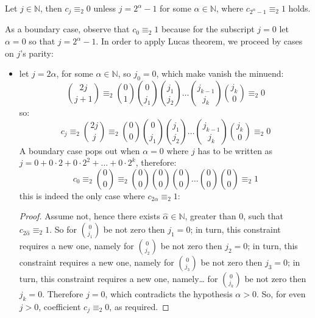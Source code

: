 \begin{theorem}
    Let $j\in\mathbb{N}$, then $c_{j} \equiv_{2} 0$ unless $j=2^{\alpha}-1$ for some $\alpha\in\mathbb{N}$, 
    where $c_{2^{\alpha}-1} \equiv_{2} 1$ holds.
\end{theorem}
As a boundary case, observe that $c_{0} \equiv_{2} 1$ because for the subscript $j=0$
let $\alpha=0$ so that $j = 2^{\alpha}-1$. In order to apply Lucas theorem, we proceed by cases on $j$'s parity:
\begin{itemize}
    \item let $j=2\alpha$, for some $\alpha\in\mathbb{N}$, so $j_{0}=0$,
        which make vanish the minuend:
        \begin{displaymath}
            {{2j}\choose{j+1}}
            \equiv_{2} {{0}\choose{1}}{{0}\choose{j_{1}}}{{j_{1}}\choose{j_{2}}}
                \ldots{{j_{k-1}}\choose{j_{k}}}{{j_{k}}\choose{0}}\equiv_{2}0
        \end{displaymath}
        so:
        \begin{displaymath}
            c_{j}\equiv_{2}{{2j}\choose{j}}
            \equiv_{2} {{0}\choose{0}}{{0}\choose{j_{1}}}{{j_{1}}\choose{j_{2}}}
                \ldots{{j_{k-1}}\choose{j_{k}}}{{j_{k}}\choose{0}}\equiv_{2}0
        \end{displaymath}
        A boundary case pops out when $\alpha=0$ where $j$ has to be written as 
        $j=0 + 0\cdot2 + 0\cdot2^{2} + \ldots + 0\cdot2^{k}$, therefore:
        \begin{displaymath}
            c_{0}\equiv_{2}{{0}\choose{0}}
            \equiv_{2} {{0}\choose{0}}{{0}\choose{0}}{{0}\choose{0}}
                \ldots{{0}\choose{0}}{{0}\choose{0}}\equiv_{2}1
        \end{displaymath}
        this is indeed the only case where $c_{2\alpha} \equiv_{2}1$:
        \begin{proof}
            Assume not, hence there exists $\hat{\alpha}\in\mathbb{N}$, greater than $0$,
            such that $c_{2\hat{\alpha}} \equiv_{2}1$. So for ${{0}\choose{j_{1}}}$
            be not zero then $j_{1}=0$; in turn, this constraint requires a new one, namely
            for ${{0}\choose{j_{2}}}$ be not zero then $j_{2}=0$; 
            in turn, this constraint requires a new one, namely
            for ${{0}\choose{j_{3}}}$ be not zero then $j_{3}=0$; 
            in turn, this constraint requires a new one, namely\ldots
            for ${{0}\choose{j_{k}}}$ be not zero then $j_{k}=0$.
            Therefore $j=0$, which contradicts the hypothesis $\alpha>0$. So,
            for even $j > 0$, coefficient $c_{j}\equiv_{2}0$, as required.
        \end{proof}


\end{itemize}
